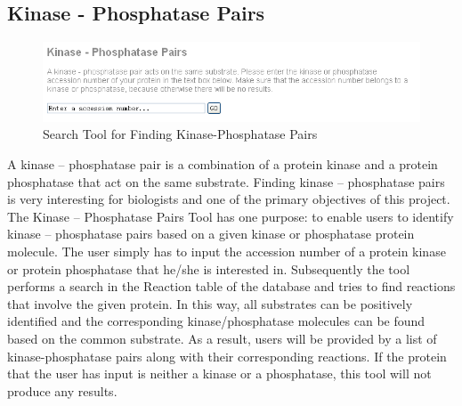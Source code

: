 \subsection{Kinase - Phosphatase Pairs}
\begin{figure}[htp]
\centering
\includegraphics[scale=0.6]{pictures/PairSearchTool.png}
\caption{Search Tool for Finding Kinase-Phosphatase Pairs}
\label{PairSearchTool}
\end{figure}
A kinase -- phosphatase pair is a combination of a protein kinase and a protein phosphatase that act on the same substrate.
Finding kinase -- phosphatase pairs is very interesting for biologists and one of the primary objectives of this project.
The Kinase -- Phosphatase Pairs Tool has one purpose: to enable users to identify kinase -- phosphatase pairs based on a given kinase or phosphatase protein molecule.
The user simply has to input the accession number of a protein kinase or protein phosphatase that he/she is interested in.
Subsequently the tool performs a search in the Reaction table of the database and tries to find reactions that involve the given protein.
In this way, all substrates can be positively identified and the corresponding kinase/phosphatase molecules can be found based on the common substrate.
As a result, users will be provided by a list of kinase-phosphatase pairs along with their corresponding reactions.
If the protein that the user has input is neither a kinase or a phosphatase, this tool will not produce any results.

